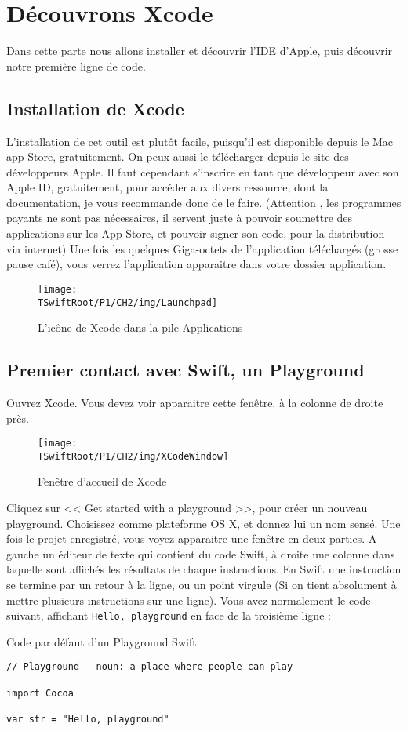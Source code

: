 \chapter{Découvrons Xcode}
Dans cette parte nous allons installer et découvrir l'IDE d’Apple, puis découvrir notre
première ligne de code.
\section{Installation de Xcode}
L'installation de cet outil est plutôt facile, puisqu’il est disponible depuis le Mac app Store,
gratuitement. On peux aussi le télécharger depuis le site des développeurs Apple. Il faut
cependant s'inscrire en tant que développeur avec son Apple ID, gratuitement, pour
accéder aux divers ressource, dont la documentation, je vous recommande donc de le
faire.
(Attention , les programmes payants ne sont pas nécessaires, il servent juste à pouvoir
soumettre des applications sur les App Store, et pouvoir signer son code, pour la
distribution via internet)
Une fois les quelques Giga-octets de l'application téléchargés (grosse pause café), vous
verrez l'application apparaitre dans votre dossier application.
\begin{figure}[H]
\texttt{[image: \\TSwiftRoot/P1/CH2/img/Launchpad]}
\caption{L'icône de Xcode dans la pile Applications}
\end{figure}
\section{Premier contact avec Swift, un Playground}
Ouvrez Xcode. Vous devez voir apparaitre cette fenêtre, à la colonne de droite près.
\begin{figure}[H]
\texttt{[image: \\TSwiftRoot/P1/CH2/img/XCodeWindow]}
\caption{Fenêtre d'accueil de Xcode}
\end{figure}

Cliquez sur << Get started with a playground >>, pour créer un nouveau playground.
Choisissez comme plateforme OS X, et donnez lui un nom sensé.
Une fois le projet enregistré, vous voyez apparaitre une fenêtre en deux parties.
A gauche un éditeur de texte qui contient du code Swift, à droite une colonne dans
laquelle sont affichés les résultats de chaque instructions.
En Swift une instruction se termine par un retour à la ligne, ou un point virgule (Si on tient
absolument à mettre plusieurs instructions sur une ligne).
Vous avez normalement le code suivant, affichant \verb"Hello, playground" en face de la troisième ligne :
\begin{listing}[h]
\caption{Code par défaut d'un Playground Swift}
\begin{verbatim}
// Playground - noun: a place where people can play

import Cocoa

var str = "Hello, playground"
\end{verbatim}
\end{listing}

